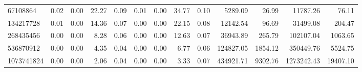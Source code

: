 \begin{tabular}{lrrrrrrrrrrrr}
67108864   &        0.02 &        0.00 &         22.27 &          0.09 &           0.01 &           0.00 &        34.77 &         0.10 &          5289.09 &            26.99 &        11787.26 &           76.11 \\
134217728  &        0.01 &        0.00 &         14.36 &          0.07 &           0.00 &           0.00 &        22.15 &         0.08 &         12142.54 &            96.69 &        31499.08 &          204.47 \\
268435456  &        0.00 &        0.00 &          8.28 &          0.06 &           0.00 &           0.00 &        12.63 &         0.07 &         36943.89 &           265.79 &       102107.04 &         1063.65 \\
536870912  &        0.00 &        0.00 &          4.35 &          0.04 &           0.00 &           0.00 &         6.77 &         0.06 &        124827.05 &          1854.12 &       350449.76 &         5524.75 \\
1073741824 &        0.00 &        0.00 &          2.06 &          0.04 &           0.00 &           0.00 &         3.33 &         0.07 &        434921.71 &          9302.76 &      1273242.43 &        19407.10 \\
\bottomrule
\end{tabular}
